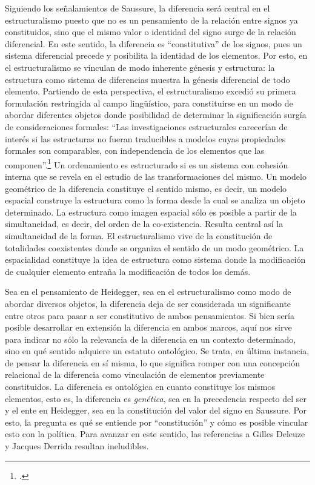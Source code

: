 Siguiendo los señalamientos de Saussure, la diferencia será central en el estructuralismo puesto que no es un pensamiento de la relación entre signos ya constituidos, sino que el mismo valor o identidad del signo surge de la relación diferencial. En este sentido, la diferencia es \enquote{constitutiva} de los signos, pues un sistema diferencial precede y posibilita la identidad de los elementos. Por esto, en el estructuralismo se vinculan de modo inherente génesis y estructura: la estructura como sistema de diferencias muestra la génesis diferencial de todo elemento. Partiendo de esta perspectiva, el estructuralismo excedió su primera formulación restringida al campo lingüístico, para constituirse en un modo de abordar diferentes objetos donde posibilidad de determinar la significación surgía de consideraciones formales: \enquote{Las investigaciones estructurales carecerían de interés si las estructuras no fueran traducibles a modelos cuyas propiedades formales son comparables, con independencia de los elementos que las componen}.\footcite[256]{@6969-LEVISTRAUSS1977} Un ordenamiento es estructurado si es un sistema con cohesión interna que se revela en el estudio de las transformaciones del mismo. Un modelo geométrico de la diferencia constituye el sentido mismo, es decir, un modelo espacial construye la estructura como la forma desde la cual se analiza un objeto determinado. La estructura como imagen espacial sólo es posible a partir de la simultaneidad, es decir, del orden de la co-existencia. Resulta central así la simultaneidad de la forma. El estructuralismo vive de la constitución de totalidades coexistentes donde se organiza el sentido de un modo geométrico. La espacialidad constituye la idea de estructura como sistema donde la modificación de cualquier elemento entraña la modificación de todos los demás.

Sea en el pensamiento de Heidegger, sea en el estructuralismo como modo de abordar diversos objetos, la diferencia deja de ser considerada un significante entre otros para pasar a ser constitutivo de ambos pensamientos. Si bien sería posible desarrollar en extensión la diferencia en ambos marcos, aquí nos sirve para indicar no sólo la relevancia de la diferencia en un contexto determinado, sino en qué sentido adquiere un estatuto ontológico. Se trata, en última instancia, de pensar la diferencia en sí misma, lo que significa romper con una concepción relacional de la diferencia como vinculación de elementos previamente constituidos. La diferencia es ontológica en cuanto constituye los mismos elementos, esto es, la diferencia es \emph{genética}, sea en la precedencia respecto del ser y el ente en Heidegger, sea en la constitución del valor del signo en Saussure. Por esto, la pregunta es qué se entiende por \enquote{constitución} y cómo es posible vincular esto con la política. Para avanzar en este sentido, las referencias a Gilles Deleuze y Jacques Derrida resultan ineludibles.

